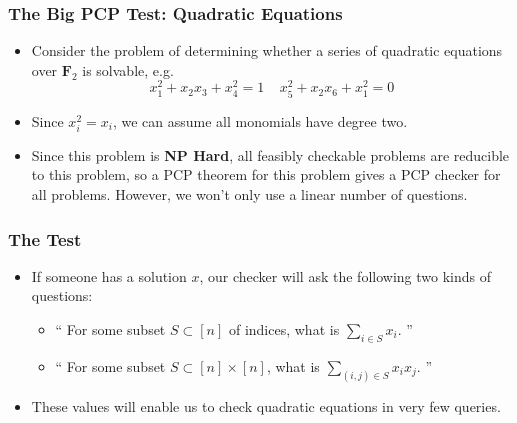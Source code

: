 \documentclass{beamer}
\begin{document}
\begin{frame}
    \frametitle{The Big PCP Test: Quadratic Equations}

    \begin{itemize}
        \item<1-> Consider the problem of determining whether a series of quadratic equations over $\mathbf{F}_2$ is solvable, e.g.
        \[ x_1^2 + x_2x_3 + x_4^2 = 1\ \ \ \ \ x_5^2 + x_2x_6 + x_1^2 = 0 \]

        \item<2-> Since $x_i^2 = x_i$, we can assume all monomials have degree two.

        \item<3-> Since this problem is {\bf NP Hard}, all feasibly checkable problems are reducible to this problem, so a PCP theorem for this problem gives a PCP checker for all problems. However, we won't only use a linear number of questions.
    \end{itemize}
\end{frame}

\begin{frame}
    \frametitle{The Test}

    \begin{itemize}
        \item<1-> If someone has a solution $x$, our checker will ask the following two kinds of questions:
        \begin{itemize}
            \item<2-> `` For some subset $S \subset [n]$ of indices, what is $\sum_{i \in S} x_i$. ''
            \item<3-> `` For some subset $S \subset [n] \times [n]$, what is $\sum_{(i,j) \in S} x_ix_j$. ''
        \end{itemize}
        \item<4-> These values will enable us to check quadratic equations in very few queries.
    \end{itemize}
\end{frame}
\end{document}
